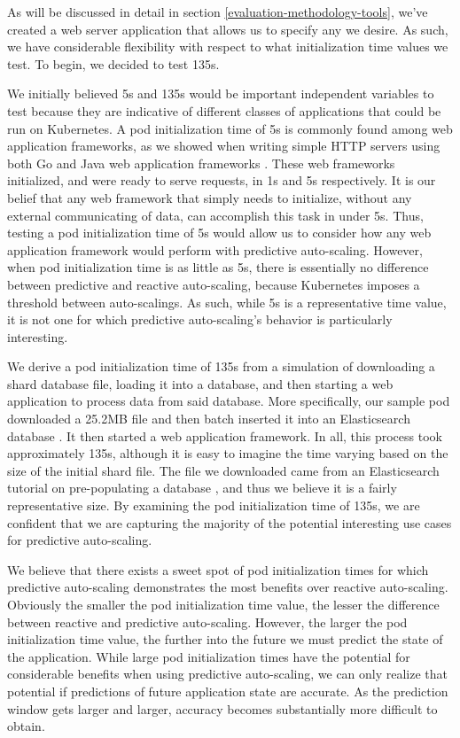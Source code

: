 As will be discussed in detail in section \ref{evaluation-methodology-tools},
we've created a web server application that allows us to specify any
 we desire. As such, we have considerable flexibility with
respect to what initialization time values we test. To begin, we decided to test 135s.

We initially believed 5s and 135s would be important independent variables to test because they
are indicative of different classes of applications that could be run on
Kubernetes. A pod initialization time of 5s is commonly found among web
application frameworks, as we showed when writing simple HTTP servers using
both Go and Java web application frameworks \cite{spring}. These web
frameworks initialized, and were ready to serve requests, in 1s and 5s
respectively. It is our belief that any web framework that simply
needs to initialize, without any external communicating of data, can
accomplish this task in under 5s. Thus, testing a pod initialization time of 5s
would allow us to consider how any web application framework would perform with
predictive auto-scaling. However, when pod initialization time is as little as
5s, there is essentially no difference between predictive and reactive
auto-scaling, because Kubernetes imposes a threshold between auto-scalings.
As such, while 5s is a representative time value, it is not
one for which predictive auto-scaling's behavior is particularly interesting.

We derive a pod initialization time of 135s from a simulation of downloading a
shard database file, loading it into a database, and then starting a web
application to process data from said database. More specifically, our sample
pod downloaded a 25.2MB file and then batch inserted it into an Elasticsearch
database \cite{elasticsearch}. It then started a web application framework. In
all, this process took approximately 135s, although it is easy to imagine the
time varying based on the size of the initial shard file. The file we downloaded
came from an Elasticsearch tutorial on pre-populating a database
\cite{elasticsearch-import-some-data}, and thus we believe it is a fairly
representative size. By examining the pod initialization time of 135s, we
are confident that we are capturing the majority of the potential interesting use cases for
predictive auto-scaling.

We believe that there exists a sweet spot of pod initialization times
for which predictive auto-scaling demonstrates the most benefits over reactive
auto-scaling. Obviously the smaller the pod initialization time value, the lesser
the difference between reactive and predictive auto-scaling.
However, the larger the pod initialization time value, the further into
the future we must predict the state of the application. While large pod
initialization times have the potential for considerable benefits when using
predictive auto-scaling, we can only realize that potential if predictions of
future application state are accurate. As the prediction window gets larger and
larger, accuracy becomes substantially more difficult to obtain.
